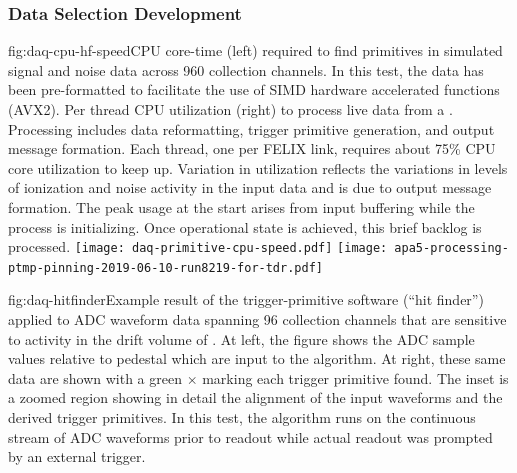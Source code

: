 \subsubsection{Data Selection Development}

\begin{dunefigure}{fig:daq-cpu-hf-speed}{CPU core-time (left) required to find primitives in simulated signal and noise data across 960 collection channels.
    In this test, the data has been pre-formatted to facilitate the use of SIMD hardware accelerated functions (AVX2). 
    Per thread CPU utilization (right) to process live data from a  .
    Processing includes data reformatting, trigger primitive generation, and output message formation.
    Each thread, one per FELIX link, requires about 75\% CPU core utilization to keep up.
    Variation in utilization reflects the variations in levels of ionization and noise activity in the input data and is due to output message formation.
    The peak usage at the start arises from input buffering while the process is initializing. 
    Once operational state is achieved, this brief backlog is processed.}
  \texttt{[image: daq-primitive-cpu-speed.pdf]}%
  \texttt{[image: apa5-processing-ptmp-pinning-2019-06-10-run8219-for-tdr.pdf]}
\end{dunefigure}

\begin{dunefigure}{fig:daq-hitfinder}{Example result of the trigger-primitive software (``hit finder'') applied to ADC waveform data spanning 96 collection channels that are sensitive to activity in the drift volume of . 
    At left, the figure shows the ADC sample values relative to pedestal which are input to the algorithm. 
    At right, these same data are shown with a green $\times$ marking each trigger primitive found. 
    The inset is a zoomed region showing in detail the alignment of the input waveforms and the derived trigger primitives.
    In this test, the algorithm runs on the continuous stream of ADC waveforms prior to readout while actual readout was prompted by an external trigger.}
\end{dunefigure}

